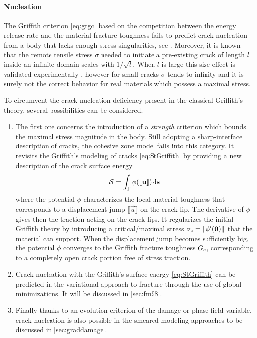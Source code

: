 \paragraph{Nucleation} The Griffith criterion \eqref{eq:gtgc} based on the competition between the energy release rate and the material fracture toughness fails to predict crack nucleation from a body that lacks enough stress singularities, see \cite{Marigo:2010}. Moreover, it is known that the remote tensile stress $\sigma$ needed to initiate a pre-existing crack of length $l$ inside an infinite domain scales with $1/\sqrt{l}$. When $l$ is large this size effect is validated experimentally \cite{Griffith:1921}, however for small cracks $\sigma$ tends to infinity and it is surely not the correct behavior for real materials which possess a maximal stress.

To circumvent the crack nucleation deficiency present in the classical Griffith's theory, several possibilities can be considered.
\begin{enumerate}
\item The first one concerns the introduction of a \emph{strength} criterion which bounds the maximal stress magnitude in the body. Still adopting a sharp-interface description of cracks, the cohesive zone model \cite{Barenblatt:1962,ElicesGuineaGomezPlanas:2002} falls into this category. It revisits the Griffith's modeling of cracks \eqref{eq:StGriffith} by providing a new description of the crack surface energy
\begin{equation} \label{eq:cohesiveSt}
\mathcal{S}=\int_{\Gamma}\phi(\llbracket\vec{u}\rrbracket)\ds
\end{equation}
where the potential $\phi$ characterizes the local material toughness that corresponds to a displacement jump $\llbracket\vec{u}\rrbracket$ on the crack lip. The derivative of $\phi$ gives then the traction acting on the crack lips. It regularizes the initial Griffith theory by introducing a critical/maximal stress $\sigma_\mc=\norm{\phi'(\vec{0})}$ that the material can support. When the displacement jump becomes sufficiently big, the potential $\phi$ converges to the Griffith fracture toughness $G_\mathrm{c}$, corresponding to a completely open crack  portion free of stress traction.

\item Crack nucleation with the Griffith's surface energy \eqref{eq:StGriffith} can be predicted in the variational approach to fracture through the use of global minimizations. It will be discussed in \cref{sec:fm98}.

\item Finally thanks to an evolution criterion of the damage or phase field variable, crack nucleation is also possible in the smeared modeling approaches to be discussed in \cref{sec:graddamage}.
\end{enumerate}


